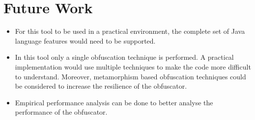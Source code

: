 \documentclass{article}
\begin{document}
\section{Future Work}
\begin{itemize}
\item For this tool to be used in a practical environment, the complete set of Java language features would need to be supported.
\item In this tool only a single obfuscation technique is performed. A practical implementation would use multiple techniques to make the
code more difficult to understand. Moreover, metamorphism based obfuscation techniques could be considered to increase the resilience of
the obfuscator.
\item Empirical performance analysis can be done to better analyse the performance of the obfuscator.
\end{itemize}




\end{document}
